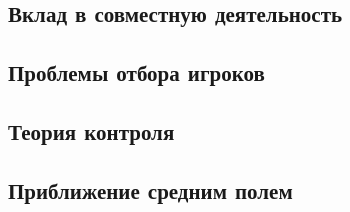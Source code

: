 

\subsection{Вклад в совместную деятельность}


\subsection{Проблемы отбора игроков}



\subsection{Теория контроля}



\subsection{Приближение средним полем}

